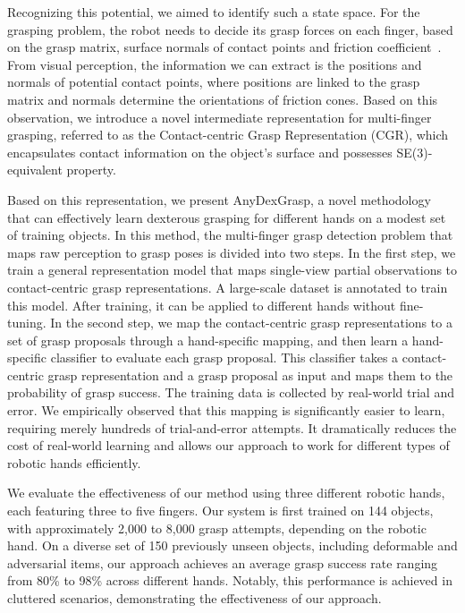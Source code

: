 Recognizing this potential, we aimed to identify such a state space. For the grasping problem, the robot needs to decide its grasp forces on each finger, based on the grasp matrix, surface normals of contact points and friction coefficient~\cite{dai2018synthesis}. From visual perception, the information we can extract is the positions and normals of potential contact points, where positions are linked to the grasp matrix and normals determine the orientations of friction cones. Based on this observation, we introduce a novel intermediate representation for multi-finger grasping, referred to as the Contact-centric Grasp Representation (CGR), which encapsulates contact information on the object's surface and possesses SE(3)-equivalent property.

Based on this representation, we present AnyDexGrasp, a novel methodology that can effectively learn dexterous grasping for different hands on a modest set of training objects. In this method, the multi-finger grasp detection problem that maps raw perception to grasp poses is divided into two steps. In the first step, we train a general representation model that maps single-view partial observations to contact-centric grasp representations. A large-scale dataset is annotated to train this model. After training, it can be applied to different hands without fine-tuning. In the second step, we map the contact-centric grasp representations to a set of grasp proposals through a hand-specific mapping, and then learn a hand-specific classifier to evaluate each grasp proposal. This classifier takes a contact-centric grasp representation and a grasp proposal as input and maps them to the probability of grasp success. The training data is collected by real-world trial and error.  We empirically observed that this mapping is significantly easier to learn, requiring merely hundreds of trial-and-error attempts. It dramatically reduces the cost of real-world learning and allows our approach to work for different types of robotic hands efficiently.

We evaluate the effectiveness of our method using three different robotic hands, each featuring three to five fingers. Our system is first trained on 144 objects, with approximately 2,000 to 8,000 grasp attempts, depending on the robotic hand. On a diverse set of 150 previously unseen objects, including deformable and adversarial items, our approach achieves an average grasp success rate ranging from 80\% to 98\% across different hands.  Notably, this performance is achieved in cluttered scenarios, demonstrating the effectiveness of our approach.

